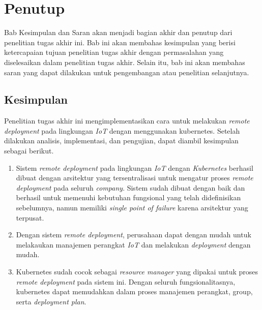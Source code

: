 \chapter{Penutup}

Bab Kesimpulan dan Saran akan menjadi bagian akhir dan penutup dari penelitian tugas akhir ini. Bab ini akan membahas kesimpulan yang berisi ketercapaian tujuan penelitian tugas akhir dengan permasalahan yang diselesaikan dalam penelitian tugas akhir. Selain itu, bab ini akan membahas saran yang dapat dilakukan untuk pengembangan atau penelitian selanjutnya.

\section{Kesimpulan}
Penelitian tugas akhir ini mengimplementasikan cara untuk melakukan \textit{remote deployment} pada lingkungan \textit{IoT} dengan menggunakan kubernetes. Setelah dilakukan analisis, implementasi, dan pengujian, dapat diambil kesimpulan sebagai berikut.
\begin{enumerate}
  \item Sistem \textit{remote deployment} pada lingkungan \textit{IoT} dengan \textit{Kubernetes} berhasil dibuat dengan arsitektur yang tersentralisasi untuk mengatur proses \textit{remote deployment} pada seluruh \textit{company}. Sistem sudah dibuat dengan baik dan berhasil untuk memenuhi kebutuhan fungsional yang telah didefinisikan sebelumnya, namun memiliki \textit{single point of failure} karena arsitektur yang terpusat.
  \item Dengan sistem \textit{remote deployment}, perusahaan dapat dengan mudah untuk melakaukan manajemen perangkat \textit{IoT} dan melakukan \textit{deployment} dengan mudah.
  \item Kubernetes sudah cocok sebagai \textit{resource manager} yang dipakai untuk proses \textit{remote deployment} pada sistem ini. Dengan seluruh fungsionalitasnya, kubernetes dapat memudahkan dalam proses manajemen perangkat, group, serta \textit{deployment plan}.
\end{enumerate}

